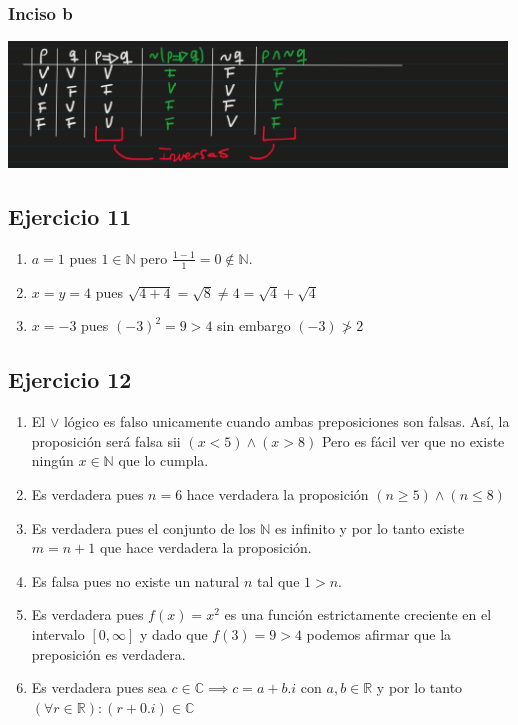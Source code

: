 \subsubsection{Inciso b}
\includegraphics[width=500px]{1.11}

\subsection{Ejercicio 11}
\begin{enumerate}[label=(\alph*)]
    \item $a = 1$ pues $1 \in \mathbb{N}$ pero $\frac{1-1}{1} = 0 \not \in \mathbb{N}$.
    \item $x = y = 4$ pues $\sqrt{4+4} = \sqrt{8} \neq 4 = \sqrt{4} + \sqrt{4}$
    \item $x = -3$ pues $(-3)^2 = 9 > 4$ sin embargo $(-3) \not > 2$
\end{enumerate}

\subsection{Ejercicio 12}
\begin{enumerate}[label=(\alph*)]
    \item El $\vee$ lógico es falso unicamente cuando ambas preposiciones son falsas. Así, la proposición será falsa sii $(x < 5) \wedge (x > 8)$
            Pero es fácil ver que no existe ningún $x \in \mathbb{N}$ que lo cumpla.
    \item Es verdadera pues $n = 6$ hace verdadera la proposición $(n \geq 5) \wedge (n \leq 8)$
    \item Es verdadera pues el conjunto de los $\mathbb{N}$ es infinito y por lo tanto existe $m = n+1$ que hace verdadera la proposición.
    \item Es falsa pues no existe un natural $n$ tal que $1 > n$.
    \item Es verdadera pues $f(x) = x^2$ es una función estrictamente creciente en el intervalo $[0, \infty]$ y dado que $f(3) = 9 > 4$ podemos afirmar que la preposición es verdadera.
    \item Es verdadera pues sea $c \in \mathbb{C} \implies c = a+b.i$ con $a,b \in \mathbb{R}$ y por lo tanto $(\forall r \in \mathbb{R}): (r + 0.i) \in \mathbb{C} $
\end{enumerate}

